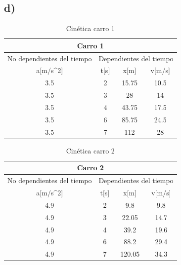 \documentclass[letterpaper,12pt]{article}
\begin{document}
 \subsection*{d)}
 \begin{table}[h]
    \centering
    \begin{tabular}{c|c|c|c}\hline\hline
    \multicolumn{4}{c}{Carro 1} \\\hline
    No dependientes del tiempo & \multicolumn{3}{c}{Dependientes del tiempo} \\\hline
    a[m/s^2]&t[s]&x[m]&v[m/s]\\\hline
    3.5&2&15.75&10.5\\\hline
    3.5&3&28&14\\\hline
    3.5&4&43.75&17.5\\\hline
    3.5&6&85.75&24.5\\\hline
    3.5&7&112&28\\\hline
    \end{tabular}
    \caption{Cinética carro 1}
    \label{tab: Cuadro1}
\end{table}
\begin{table}[h]
    \centering
    \begin{tabular}{c|c|c|c}\hline\hline
    \multicolumn{4}{c}{Carro 2} \\\hline
    No dependientes del tiempo & \multicolumn{3}{c}{Dependientes del tiempo} \\\hline
    a[m/s^2]&t[s]&x[m]&v[m/s]\\\hline
    4.9&2&9.8&9.8\\\hline
    4.9&3&22.05&14.7\\\hline
    4.9&4&39.2&19.6\\\hline
    4.9&6&88.2&29.4\\\hline
    4.9&7&120.05&34.3\\\hline\hline
    \end{tabular}
    \caption{Cinética carro 2}
    \label{tabla: Cuadro1}
\end{table}
\end{document}
